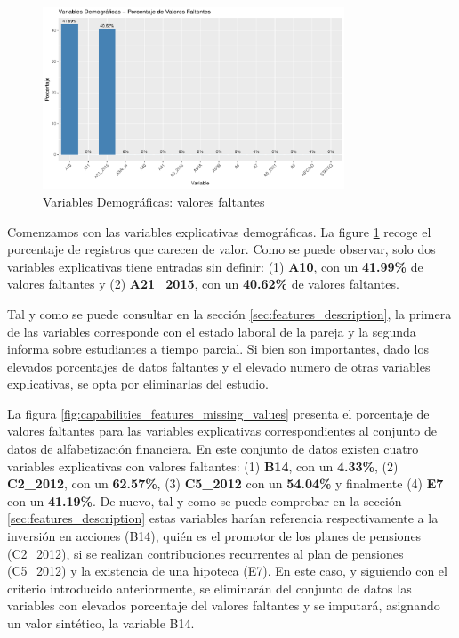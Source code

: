 \documentclass[a4paper, 11pt]{article}
\begin{document}
\begin{figure}[ht]
    \centering
    \includegraphics[width=0.8\textwidth]{images/Demographic_Features__Missing_Values.pdf} 
    \caption{Variables Demográficas: valores faltantes}
    \label{fig:demographic_features_missing_values}
\end{figure}

Comenzamos con las variables explicativas demográficas. La figure \ref{fig:demographic_features_missing_values}
recoge el porcentaje de registros que carecen de valor. Como se puede observar, solo dos 
variables explicativas tiene entradas sin definir: (1) \textbf{A10}, con un \textbf{41.99\%}
de valores faltantes y (2) \textbf{A21\_2015}, con un \textbf{40.62\%} de valores faltantes. 

Tal y como se puede consultar en la sección \ref{sec:features_description}, la 
primera de las variables corresponde con el estado laboral de la pareja y la segunda informa 
sobre estudiantes a tiempo parcial. Si bien son importantes, dado los elevados porcentajes de
datos faltantes y el elevado numero de otras variables explicativas, se opta por eliminarlas
del estudio.

La figura \ref{fig:capabilities_features_missing_values} presenta el porcentaje de valores 
faltantes para las variables explicativas correspondientes al conjunto de datos de alfabetización
financiera. En este conjunto de datos existen cuatro variables explicativas con valores faltantes:
(1) \textbf{B14}, con un \textbf{4.33\%}, (2) \textbf{C2\_2012}, con un \textbf{62.57\%}, (3) 
\textbf{C5\_2012} con un \textbf{54.04\%} y finalmente (4) \textbf{E7} con un \textbf{41.19\%}. De
nuevo, tal y como se puede comprobar en la sección \ref{sec:features_description} estas variables harían
referencia respectivamente a la inversión en acciones (B14), quién es el promotor de los planes de
pensiones (C2\_2012), si se realizan contribuciones recurrentes al plan de pensiones (C5\_2012) y
la existencia de una hipoteca (E7). En este caso, y siguiendo con el criterio introducido 
anteriormente, se eliminarán del conjunto de datos las variables con elevados porcentaje del valores faltantes y se imputará, asignando un valor sintético, la variable B14.
\end{document}
